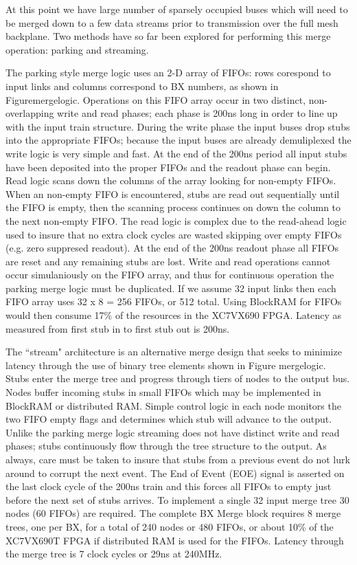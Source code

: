 \documentclass[letterpaper]{article}
\begin{document}
At this point we have large number of sparsely occupied buses which will need to be merged down to a few data streams prior to transmission over the full mesh backplane.  Two methods have so far been explored for performing this merge operation: parking and streaming.  

The parking style merge logic uses an 2-D array of FIFOs: rows corespond to input links and columns correspond to BX numbers, as shown in Figure{mergelogic}.  Operations on this FIFO array occur in two distinct, non-overlapping write and read phases; each phase is 200ns long in order to line up with the input train structure.  During the write phase the input buses drop stubs into the appropriate FIFOs; because the input buses are already demuliplexed the write logic is very simple and fast.  At the end of the 200ns period all input stubs have been deposited into the proper FIFOs and the readout phase can begin.  Read logic scans down the columns of the array looking for non-empty FIFOs.  When an non-empty FIFO is encountered, stubs are read out sequentially until the FIFO is empty, then the scanning process continues on down the column to the next non-empty FIFO.  The read logic is complex due to the read-ahead logic used to insure that no extra clock cycles are wasted skipping over empty FIFOs (e.g. zero suppresed readout).  At the end of the 200ns readout phase all FIFOs are reset and any remaining stubs are lost.  Write and read operations cannot occur simulaniously on the FIFO array, and thus for continuous operation the parking merge logic must be duplicated.  If we assume 32 input links then each FIFO array uses 32 x 8 = 256 FIFOs, or 512 total.  Using BlockRAM for FIFOs would then consume 17\% of the resources in the XC7VX690 FPGA.  Latency as measured from first stub in to first stub out is 200ns.

The ``stream" architecture is an alternative merge design that seeks to minimize latency through the use of binary tree elements shown in Figure {mergelogic}.  Stubs enter the merge tree and progress through tiers of nodes to the output bus.  Nodes buffer incoming stubs in small FIFOs which may be implemented in BlockRAM or distributed RAM.  Simple control logic in each node monitors the two FIFO empty flags and determines which stub will advance to the output.  Unlike the parking merge logic streaming does not have distinct write and read phases; stubs continuously flow through the tree structure to the output.  As always, care must be taken to insure that stubs from a previous event do not lurk around to corrupt the next event.  The End of Event (EOE) signal is asserted on the last clock cycle of the 200ns train and this forces all FIFOs to empty just before the next set of stubs arrives.  To implement a single 32 input merge tree 30 nodes (60 FIFOs) are required.  The complete BX Merge block requires 8 merge trees, one per BX, for a total of 240 nodes or 480 FIFOs, or about 10\% of the XC7VX690T FPGA if distributed RAM is used for the FIFOs.  Latency through the merge tree is 7 clock cycles or 29ns at 240MHz.
\end{document}
